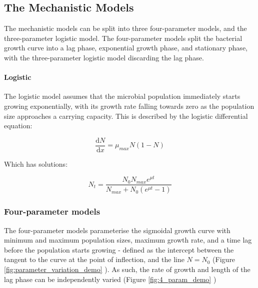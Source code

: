 \documentclass[11pt, a4paper]{article}
\begin{document}
\begin{linenumbers}
\subsection*{The Mechanistic Models}

The mechanistic models can be split into three four-parameter models, and the three-parameter logistic model. The four-parameter models split the bacterial growth curve into a lag phase, exponential growth phase, and stationary phase, with the three-parameter logistic model discarding the lag phase.

\paragraph*{Logistic}
The logistic model \cite{logisticVel1, logisticVel2} assumes that the microbial population immediately starts growing exponentially, with its growth rate falling towards zero as the population size approaches a carrying capacity. This is described by the logistic differential equation:

\[ \frac{\mathrm d N}{\mathrm d x} =  \mu_{max}N(1-N)  \]

Which has solutions:

\[ N_t =   \frac{N_0  N_{max} e^{\mu t}}{N_{max} + N_0 (e^{\mu t} - 1)} \]


\subsubsection{Four-parameter models}

The four-parameter models parameterise the sigmoidal growth curve with minimum and maximum population sizes, maximum growth rate, and a time lag before the population starts growing - defined as the intercept between the tangent to the curve at the point of inflection, and the line $N = N_0$ (Figure \ref{fig:parameter_variation_demo} ). As such, the rate of growth and length of the lag phase can be independently varied (Figure \ref{fig:4_param_demo} )


\end{linenumbers}
\end{document}
